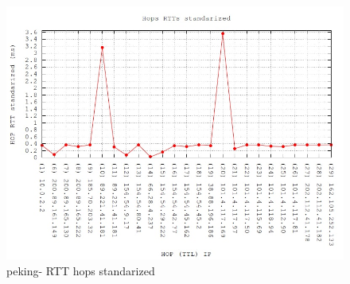 \begin{figure}[!htbp]
  \centering
    \includegraphics[scale=0.5]{imagenes/peking-graficos/traceroute-peking-standarized.jpg}
  \caption{peking- RTT hops standarized}
  \label{fig:11}
\end{figure}


